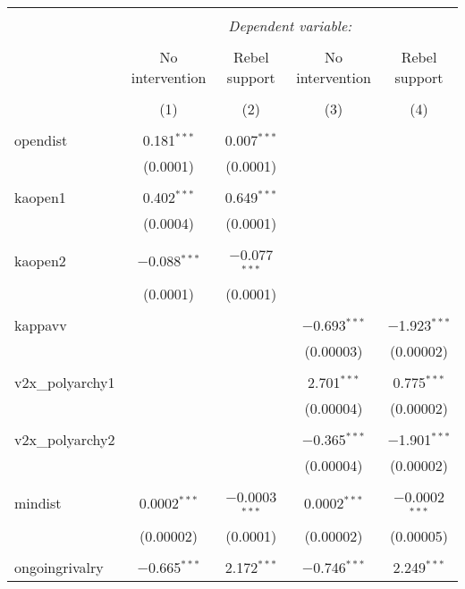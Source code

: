 
\begin{table}[!htbp] \centering 
  \caption{} 
  \label{} 
\begin{tabular}{@{\extracolsep{5pt}}lcccc} 
\\[-1.8ex]\hline 
\hline \\[-1.8ex] 
 & \multicolumn{4}{c}{\textit{Dependent variable:}} \\ 
\cline{2-5} 
\\[-1.8ex] & No intervention & Rebel support & No intervention & Rebel support \\ 
\\[-1.8ex] & (1) & (2) & (3) & (4)\\ 
\hline \\[-1.8ex] 
 opendist & 0.181$^{***}$ & 0.007$^{***}$ &  &  \\ 
  & (0.0001) & (0.0001) &  &  \\ 
  & & & & \\ 
 kaopen1 & 0.402$^{***}$ & 0.649$^{***}$ &  &  \\ 
  & (0.0004) & (0.0001) &  &  \\ 
  & & & & \\ 
 kaopen2 & $-$0.088$^{***}$ & $-$0.077$^{***}$ &  &  \\ 
  & (0.0001) & (0.0001) &  &  \\ 
  & & & & \\ 
 kappavv &  &  & $-$0.693$^{***}$ & $-$1.923$^{***}$ \\ 
  &  &  & (0.00003) & (0.00002) \\ 
  & & & & \\ 
 v2x\_polyarchy1 &  &  & 2.701$^{***}$ & 0.775$^{***}$ \\ 
  &  &  & (0.00004) & (0.00002) \\ 
  & & & & \\ 
 v2x\_polyarchy2 &  &  & $-$0.365$^{***}$ & $-$1.901$^{***}$ \\ 
  &  &  & (0.00004) & (0.00002) \\ 
  & & & & \\ 
 mindist & 0.0002$^{***}$ & $-$0.0003$^{***}$ & 0.0002$^{***}$ & $-$0.0002$^{***}$ \\ 
  & (0.00002) & (0.0001) & (0.00002) & (0.00005) \\ 
  & & & & \\ 
 ongoingrivalry & $-$0.665$^{***}$ & 2.172$^{***}$ & $-$0.746$^{***}$ & 2.249$^{***}$ \\ 

\end{tabular}
\end{table}
